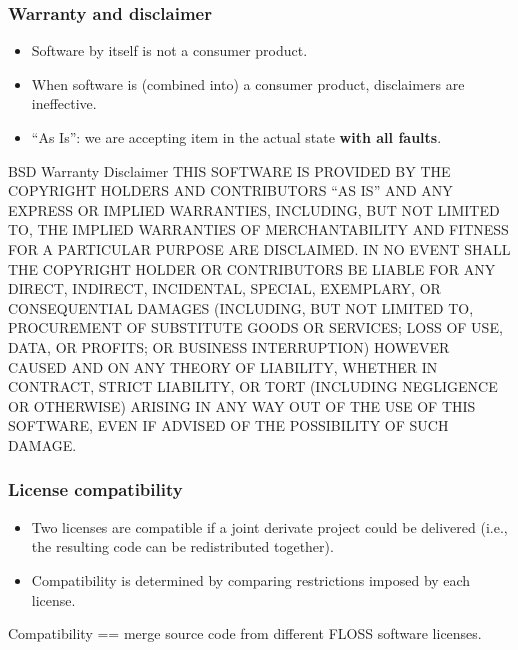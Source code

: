 \documentclass{beamer}
\begin{document}
\begin{frame}
\frametitle{Warranty and disclaimer}
\begin{itemize}
    \item Software by itself is not a consumer product.
    \item When software is (combined into) a consumer product, disclaimers are ineffective.
    \item ``As Is'': we are accepting item in the actual state \textbf{with all faults}.
\end{itemize}

\end{frame}
 
\begin{frame}
\begin{block}{BSD Warranty Disclaimer}
\small{THIS SOFTWARE IS PROVIDED BY THE COPYRIGHT HOLDERS AND CONTRIBUTORS ``AS IS'' AND ANY EXPRESS OR IMPLIED WARRANTIES, INCLUDING, BUT NOT LIMITED TO, THE IMPLIED WARRANTIES OF MERCHANTABILITY AND FITNESS FOR A PARTICULAR PURPOSE ARE DISCLAIMED. IN NO EVENT SHALL THE COPYRIGHT HOLDER OR CONTRIBUTORS BE LIABLE FOR ANY DIRECT, INDIRECT, INCIDENTAL, SPECIAL, EXEMPLARY, OR CONSEQUENTIAL DAMAGES (INCLUDING, BUT NOT LIMITED TO, PROCUREMENT OF SUBSTITUTE GOODS OR SERVICES; LOSS OF USE, DATA, OR PROFITS; OR BUSINESS INTERRUPTION) HOWEVER CAUSED AND ON ANY THEORY OF LIABILITY, WHETHER IN CONTRACT, STRICT LIABILITY, OR TORT (INCLUDING NEGLIGENCE OR OTHERWISE) ARISING IN ANY WAY OUT OF THE USE OF THIS SOFTWARE, EVEN IF ADVISED OF THE POSSIBILITY OF SUCH DAMAGE.}
\end{block}

\end{frame}




\begin{frame}
\frametitle{License compatibility}

\begin{itemize}
\item Two licenses are compatible if a joint derivate project could be delivered (i.e., the resulting code can be redistributed together).
\item Compatibility is determined by comparing restrictions imposed by each license.
\end{itemize}

Compatibility == merge source code from different FLOSS software licenses.

\end{frame}
\end{document}
